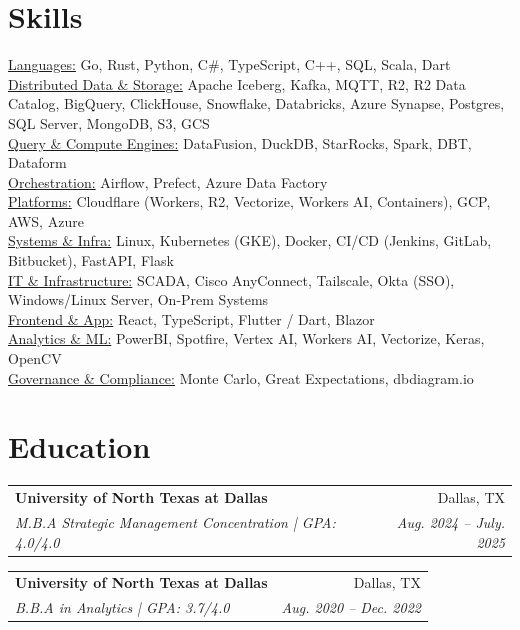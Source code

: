 \documentclass[11pt, a4paper]{article}
\makeatletter
\newcommand{\resumeSubheading}[4]{
  \vspace{8pt}\item%
    \begin{tabular*}{0.97\textwidth}[t]{l@{\extracolsep{\fill}}r}
      \textbf{#1} & #2 \\
      \textit{\small#3} & \textit{\small #4} \\
    \end{tabular*}\vspace{-5pt}
}
\newcommand{\resumeTech}[2]{
 \underline{#1:} #2
}
\makeatother
\begin{document}
\section{Skills}

\resumeTech{Languages}{Go, Rust, Python, C\#, TypeScript, C++, SQL, Scala, Dart} \\
\resumeTech{Distributed Data \& Storage}{Apache Iceberg, Kafka, MQTT, R2, R2 Data Catalog, BigQuery, ClickHouse, Snowflake, Databricks, Azure Synapse, Postgres, SQL Server, MongoDB, S3, GCS} \\
\resumeTech{Query \& Compute Engines}{DataFusion, DuckDB, StarRocks, Spark, DBT, Dataform} \\
\resumeTech{Orchestration}{Airflow, Prefect, Azure Data Factory} \\
\resumeTech{Platforms}{Cloudflare (Workers, R2, Vectorize, Workers AI, Containers), GCP, AWS, Azure} \\
\resumeTech{Systems \& Infra}{Linux, Kubernetes (GKE), Docker, CI/CD (Jenkins, GitLab, Bitbucket), FastAPI, Flask} \\
\resumeTech{IT \& Infrastructure}{SCADA, Cisco AnyConnect, Tailscale, Okta (SSO), Windows/Linux Server, On-Prem Systems} \\
\resumeTech{Frontend \& App}{React, TypeScript, Flutter / Dart, Blazor} \\
\resumeTech{Analytics \& ML}{PowerBI, Spotfire, Vertex AI, Workers AI, Vectorize, Keras, OpenCV} \\
\resumeTech{Governance \& Compliance}{Monte Carlo, Great Expectations, dbdiagram.io} \\



\section{Education}



    \resumeSubheading
      {University of North Texas at Dallas}{Dallas, TX}
      {M.B.A Strategic Management Concentration | \textit{GPA: 4.0/4.0} } {Aug. 2024 – July. 2025}

    \resumeSubheading
      {University of North Texas at Dallas}{Dallas, TX}
      {B.B.A in Analytics | \textit{GPA: 3.7/4.0} } {Aug. 2020 – Dec. 2022}
\end{document}
